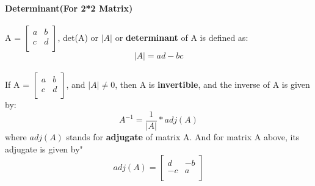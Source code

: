 \documentclass{article}
\begin{document}
	\paragraph{Determinant(For 2*2 Matrix)} A = $\begin{bmatrix}
		a & b \\
		c & d \\
	\end{bmatrix}$, det(A) or $\lvert A \rvert$ or \textbf{determinant} of A is defined as:
	\[
	\lvert A \rvert = ad - bc
	\]
	\paragraph{} If A = $\begin{bmatrix}
		a & b \\
		c & d \\
	\end{bmatrix}$, and $\lvert A \rvert \neq 0$, then A is \textbf{invertible}, and the inverse of A is given by:
	\[
	A^{-1} = \frac{1}{\lvert A \rvert} * adj(A)
	\]
	where $adj(A)$ stands for \textbf{adjugate} of matrix A. And for matrix A above, its adjugate is given by"
	\[
	adj(A) = \begin{bmatrix}
		d & -b \\
		-c & a \\
	\end{bmatrix}
	\]
\end{document}
